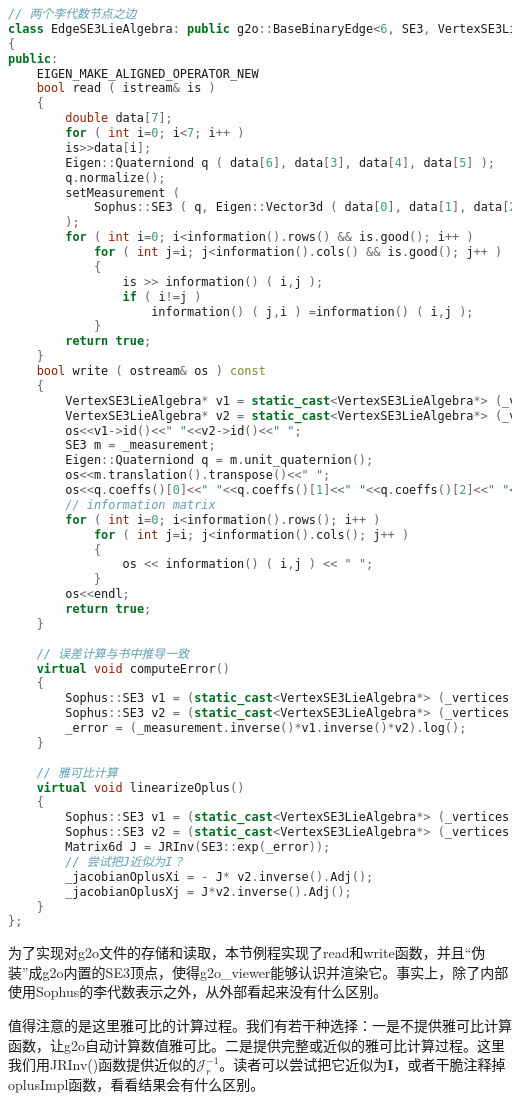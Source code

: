 \begin{lstlisting}[language=c++,caption=slambook/ch11/pose\_graph\_g2o\_lie\_algebra.cpp（片段）]
// 两个李代数节点之边
class EdgeSE3LieAlgebra: public g2o::BaseBinaryEdge<6, SE3, VertexSE3LieAlgebra, VertexSE3LieAlgebra>
{
public:
	EIGEN_MAKE_ALIGNED_OPERATOR_NEW
	bool read ( istream& is )
	{
		double data[7];
		for ( int i=0; i<7; i++ )
		is>>data[i];
		Eigen::Quaterniond q ( data[6], data[3], data[4], data[5] );
		q.normalize();
		setMeasurement (
			Sophus::SE3 ( q, Eigen::Vector3d ( data[0], data[1], data[2] ) ) 
		);
		for ( int i=0; i<information().rows() && is.good(); i++ )
			for ( int j=i; j<information().cols() && is.good(); j++ )
			{
				is >> information() ( i,j );
				if ( i!=j )
					information() ( j,i ) =information() ( i,j );
			}
		return true;
	}
	bool write ( ostream& os ) const
	{
		VertexSE3LieAlgebra* v1 = static_cast<VertexSE3LieAlgebra*> (_vertices[0]);
		VertexSE3LieAlgebra* v2 = static_cast<VertexSE3LieAlgebra*> (_vertices[1]);
		os<<v1->id()<<" "<<v2->id()<<" ";
		SE3 m = _measurement;
		Eigen::Quaterniond q = m.unit_quaternion();
		os<<m.translation().transpose()<<" ";
		os<<q.coeffs()[0]<<" "<<q.coeffs()[1]<<" "<<q.coeffs()[2]<<" "<<q.coeffs()[3]<<" ";
		// information matrix 
		for ( int i=0; i<information().rows(); i++ )
			for ( int j=i; j<information().cols(); j++ )
			{
				os << information() ( i,j ) << " ";
			}
		os<<endl;
		return true;
	}
	
	// 误差计算与书中推导一致
	virtual void computeError()
	{
		Sophus::SE3 v1 = (static_cast<VertexSE3LieAlgebra*> (_vertices[0]))->estimate();
		Sophus::SE3 v2 = (static_cast<VertexSE3LieAlgebra*> (_vertices[1]))->estimate();
		_error = (_measurement.inverse()*v1.inverse()*v2).log();
	}
	
	// 雅可比计算
	virtual void linearizeOplus()
	{
		Sophus::SE3 v1 = (static_cast<VertexSE3LieAlgebra*> (_vertices[0]))->estimate();
		Sophus::SE3 v2 = (static_cast<VertexSE3LieAlgebra*> (_vertices[1]))->estimate();
		Matrix6d J = JRInv(SE3::exp(_error));
		// 尝试把J近似为I？
		_jacobianOplusXi = - J* v2.inverse().Adj();
		_jacobianOplusXj = J*v2.inverse().Adj();
	}
};
\end{lstlisting}

为了实现对g2o文件的存储和读取，本节例程实现了read和write函数，并且“伪装”成g2o内置的SE3顶点，使得g2o\_viewer能够认识并渲染它。事实上，除了内部使用Sophus的李代数表示之外，从外部看起来没有什么区别。

值得注意的是这里雅可比的计算过程。我们有若干种选择：一是不提供雅可比计算函数，让g2o自动计算数值雅可比。二是提供完整或近似的雅可比计算过程。这里我们用JRInv()函数提供近似的$\bm{\mathcal{J}}_r^{-1}$。读者可以尝试把它近似为$\bm{I}$，或者干脆注释掉oplusImpl函数，看看结果会有什么区别。

